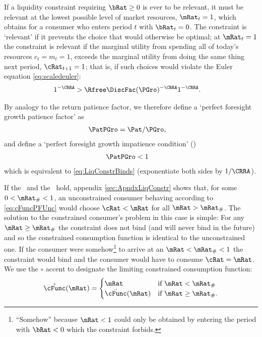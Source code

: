 \documentclass[BufferStockTheory]{subfiles}
\begin{document}
If a liquidity constraint requiring $\bRat \geq 0$ is ever to be relevant, it must be
relevant at the lowest possible level of market resources,
$\mRat_{t}=1$, which obtains for a consumer who enters period $t$ with
$\bRat_{t}=0$.  The constraint is `relevant' if
it prevents the choice that would otherwise be optimal; at
$\mRat_{t}=1$ the constraint is relevant if the marginal utility from spending all of today's
resources $c_{t}=m_{t}=1$, exceeds the marginal utility from
doing the same thing next period, $\cRat_{t+1}=1$; that is, if such
choices would violate the Euler equation \eqref{eq:scaledeuler}:
\begin{align}
  1^{-\CRRA}  & > \Rfree \DiscFac (\PGro)^{-\CRRA}1^{-\CRRA}  \label{eq:LiqConstrBinds}.
\end{align}

\hypertarget{PFGPF}{}
\hypertarget{PFGIC}{}
By analogy to the return patience factor, we therefore define a `perfect
foresight growth patience factor' as
\begin{align}
  \PatPGro  & = {\Pat}/\PGro,  \label{eq:PFGPF}
\end{align}
and define a `perfect foresight growth impatience condition' (\PFGIC)
\begin{align}
  \label{eq:PFGIC}
  \PatPGro &  < 1
\end{align}
which is equivalent to \eqref{eq:LiqConstrBinds} (exponentiate both
sides by $1/\CRRA$).

If the \RIC~and the \FHWC~hold, appendix \ref{sec:ApndxLiqConstr} shows
that, for some $0 < \mRat_{\#} < 1$, an unconstrained consumer behaving according to
\eqref{eq:cFuncPFUnc} would choose $\cRat < \mRat$ for all $\mRat >
\mRat_{\#}$.  The solution to the
constrained consumer's problem in this case is simple: For any $\mRat
\geq \mRat_{\#}$ the constraint does not bind (and will never bind in
the future) and so the constrained consumption function is identical
to the unconstrained one.  If the consumer were somehow\footnote{``Somehow'' because $\mRat<1$ could only be
  obtained by entering the period with $\bRat < 0$ which the constraint
  forbids.}
to arrive at an $\mRat < \mRat_{\#} < 1$ the constraint would bind and
the consumer would have to consume $\cRat=\mRat$.  We use the $\circ$ accent to designate the limiting
constrained consumption function:
\begin{equation}
  \mathring{\cFunc}(\mRat)=
  \begin{cases}
    \mRat & \text{if $\mRat < \mRat_{\#}$} \\
    \bar{\cFunc}(\mRat)  & \text{if $\mRat \geq \mRat_{\#}$.}
  \end{cases}
\end{equation}
\end{document}
